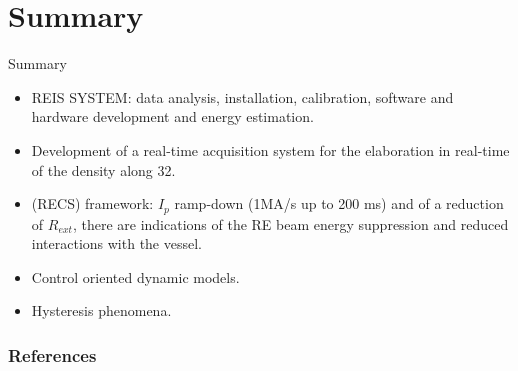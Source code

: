 \documentclass{beamer}
\begin{document}
\section{Summary}
\begin{frame}{Summary}
	\begin{itemize}
    	\item REIS SYSTEM: data analysis, installation, calibration, software and hardware development and energy estimation.
		\item Development of a real-time acquisition system for the elaboration in real-time of the density along 32.
		\item (RECS) framework: $I_p$ ramp-down (1MA/s up to 200 ms) and of a  reduction of $R_{ext}$, there are indications of the RE beam energy suppression and reduced interactions with the vessel.
		\item Control oriented dynamic models. 
		\item Hysteresis phenomena.
	\end{itemize}
\end{frame}

\begin{frame}[allowframebreaks]
\frametitle{References}
\tiny


\end{frame}
\end{document}
